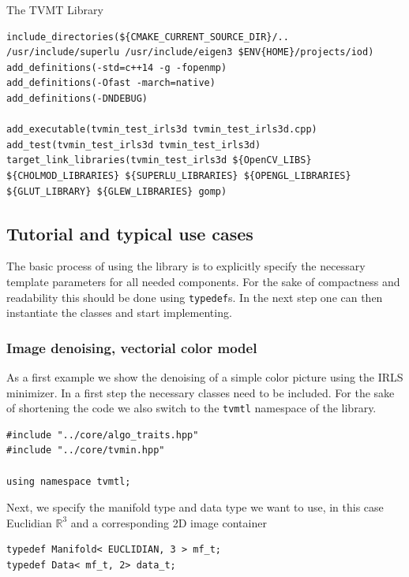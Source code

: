 \begin{chapter}{The TVMT Library}
\begin{lstlisting}
include_directories(${CMAKE_CURRENT_SOURCE_DIR}/.. /usr/include/superlu /usr/include/eigen3 $ENV{HOME}/projects/iod)
add_definitions(-std=c++14 -g -fopenmp)
add_definitions(-Ofast -march=native)
add_definitions(-DNDEBUG)

add_executable(tvmin_test_irls3d tvmin_test_irls3d.cpp)
add_test(tvmin_test_irls3d tvmin_test_irls3d)
target_link_libraries(tvmin_test_irls3d ${OpenCV_LIBS} ${CHOLMOD_LIBRARIES} ${SUPERLU_LIBRARIES} ${OPENGL_LIBRARIES} ${GLUT_LIBRARY} ${GLEW_LIBRARIES} gomp)
\end{lstlisting}




\subsection{Tutorial and typical use cases} %
\label{sub:Tutorial and typical use cases}
The basic process of using the library is to explicitly specify the necessary template parameters for all needed components. 
For the sake of compactness and readability this should be done using \texttt{typedef}s. In the next step one can then
instantiate the classes and start implementing.\\

\subsubsection{Image denoising, vectorial color model} %
\label{ssub:Image denoising, vectorial color model}
As a first example we show the denoising of a simple color picture using the IRLS minimizer. In a first step the necessary classes need to be included. For the sake of shortening the 
code we also switch to the \texttt{tvmtl} namespace of the library. \\
\cppinline
\begin{lstlisting}[label=code:tut_include,caption={Inclusion of library headers}]
#include "../core/algo_traits.hpp"
#include "../core/tvmin.hpp"

using namespace tvmtl;
\end{lstlisting}

Next, we specify the manifold type and data type we want to use, in this case Euclidian $\mathbb{R}^3$ and a corresponding 2D image container\\

\cppinline
\begin{lstlisting}[label=code:tut_typedef,caption={Specification of manifold and data type}]
typedef Manifold< EUCLIDIAN, 3 > mf_t;
typedef Data< mf_t, 2> data_t;
\end{lstlisting}


\end{chapter}
